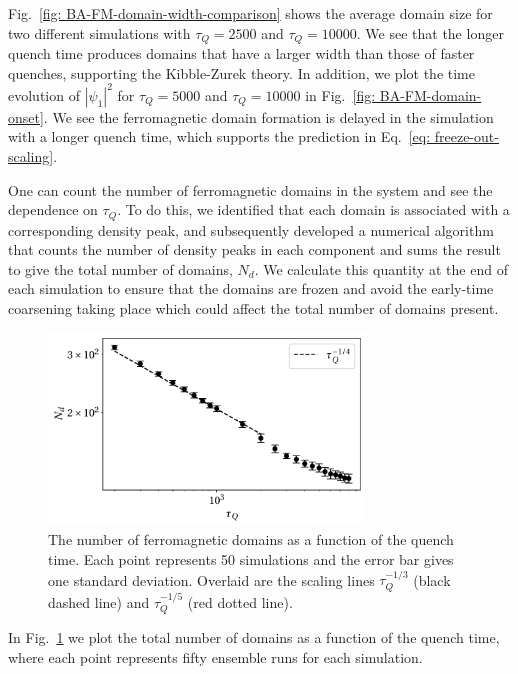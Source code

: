 Fig.~\ref{fig: BA-FM-domain-width-comparison} shows the average domain size
for two different simulations with \(\tau_Q=2500\) and \(\tau_Q=10000\).
We see that the longer quench time produces domains that have a
larger width than those of faster quenches, supporting the Kibble-Zurek theory.
In addition, we plot the time evolution of \(|\psi_1|^2\) for \(\tau_Q=5000\) and
\(\tau_Q=10000\) in Fig.~\ref{fig: BA-FM-domain-onset}.
We see the ferromagnetic domain formation is delayed in the simulation
with a longer quench time, which supports the prediction in
Eq.~\eqref{eq: freeze-out-scaling}.

One can count the number of ferromagnetic domains in the system and see the
dependence on \( \tau_Q \).
To do this, we identified that each domain is associated with a corresponding
density peak, and subsequently developed a numerical algorithm that counts the
number of density peaks in each component and sums the result to give the total
number of domains, \(N_d\).
We calculate this quantity at the end of each simulation to ensure that the
domains are frozen and avoid the early-time coarsening taking place which could
affect the total number of domains present.
\begin{figure}[htb!]
    \centering
    \includegraphics[width=0.75\textwidth]{gfx/ch-spin1/FM_domains_scaling.pdf}
    \caption[Total ferromagnetic domains in the system versus the quench rate
        \(\tau_Q\)]
    {The number of ferromagnetic domains as a function of the
        quench time. Each point represents 50 simulations and the
        error bar gives one standard deviation. Overlaid are the scaling lines
        \(\tau_Q^{-1/3}\) (black dashed line) and \(\tau_Q^{-1/5}\)
        (red dotted line).\label{fig: FM-domains-scaling}}
\end{figure}
In Fig.~\ref{fig: FM-domains-scaling} we plot the total number of domains
as a function of the quench time, where each point represents fifty ensemble
runs for each simulation.
